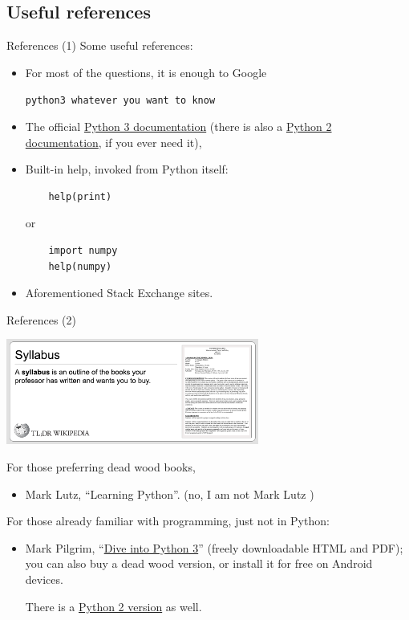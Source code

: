 \documentclass[xcolor=dvipsnames, 12pt]{beamer}
\newcommand{\MYTITLECOLOUR} {\textcolor[rgb]{1.,0.85,0.}}  %
\newenvironment{myFrame}[1]%
{\begin{frame}{\MYTITLECOLOUR{#1}}}%
{\end{frame}}
\begin{document}
\subsection{Useful references}

\begin{frame}[fragile]{\MYTITLECOLOUR{References (1)}}
Some useful references:
\begin{itemize}
  \item For most of the questions, it is enough to Google \par
    {\tt python3 whatever you want to know}
  \item The official \href{https://docs.python.org/}{Python 3 documentation} (there is also a \href{https://docs.python.org/2.7/}{Python 2 documentation}, if you ever need it),
  \item Built-in help, invoked from Python itself:
    \begin{lstlisting}
    help(print)
    \end{lstlisting}
    or
    \begin{lstlisting}
    import numpy
    help(numpy)
    \end{lstlisting}
  \item Aforementioned Stack Exchange sites.
\end{itemize}
\end{frame}


\begin{myFrame}{References (2)}
\begin{center}
\vskip-5mm\includegraphics[width=83mm]{images/syllabus.png}
\end{center}\vskip-3mm
For those preferring dead wood books,
\begin{itemize}
  \item Mark Lutz, ``Learning Python''. (no, I am not Mark Lutz \Smiley{})
\end{itemize}
For those already familiar with programming, just not in Python:
\begin{itemize}
  \item Mark Pilgrim, ``\href{http://www.diveintopython3.net/}{Dive into Python 3}'' (freely downloadable HTML and PDF); you can also buy a dead wood version, or install it for free on Android devices. \par
    There is a \href{http://www.diveintopython.net/}{Python 2 version} as well.
\end{itemize}
\end{myFrame}
\end{document}
